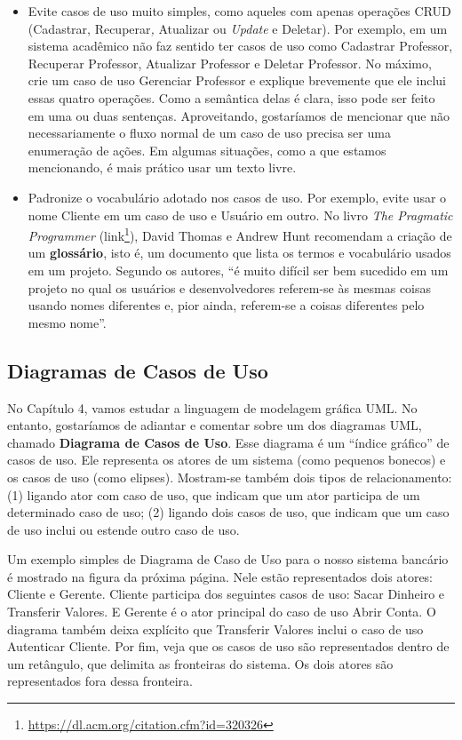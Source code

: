 \documentclass[
  11pt,
  twoside]{book}
\DeclareRobustCommand{\href}[2]{#2\footnote{\url{#1}}}
\begin{document}
\begin{itemize}
\item
  Evite casos de uso muito simples, como aqueles com apenas operações
  CRUD (Cadastrar, Recuperar\emph{,} Atualizar ou \emph{Update} e
  Deletar). Por exemplo, em um sistema acadêmico não faz sentido ter
  casos de uso como Cadastrar Professor, Recuperar Professor, Atualizar
  Professor e Deletar Professor. No máximo, crie um caso de uso
  Gerenciar Professor e explique brevemente que ele inclui essas quatro
  operações. Como a semântica delas é clara, isso pode ser feito em uma
  ou duas sentenças. Aproveitando, gostaríamos de mencionar que não
  necessariamente o fluxo normal de um caso de uso precisa ser uma
  enumeração de ações. Em algumas situações, como a que estamos
  mencionando, é mais prático usar um texto livre.
\item
  Padronize o vocabulário adotado nos casos de uso. Por exemplo, evite
  usar o nome Cliente em um caso de uso e Usuário em outro. No livro
  \emph{The Pragmatic Programmer}
  (\href{https://dl.acm.org/citation.cfm?id=320326}{link}), David Thomas
  e Andrew Hunt recomendam a criação de um \textbf{glossário}, isto é,
  um documento que lista os termos e vocabulário usados em um projeto.
  Segundo os autores, ``é muito difícil ser bem sucedido em um projeto
  no qual os usuários e desenvolvedores referem-se às mesmas coisas
  usando nomes diferentes e, pior ainda, referem-se a coisas diferentes
  pelo mesmo nome''.
\end{itemize}

\hypertarget{diagramas-de-casos-de-uso}{%
\subsection{Diagramas de Casos de Uso}\label{diagramas-de-casos-de-uso}}

 

No Capítulo 4, vamos estudar a linguagem de modelagem gráfica UML. No
entanto, gostaríamos de adiantar e comentar sobre um dos diagramas UML,
chamado \textbf{Diagrama de Casos de Uso}. Esse diagrama é um ``índice
gráfico'' de casos de uso. Ele representa os atores de um sistema (como
pequenos bonecos) e os casos de uso (como elipses). Mostram-se também
dois tipos de relacionamento: (1) ligando ator com caso de uso, que
indicam que um ator participa de um determinado caso de uso; (2) ligando
dois casos de uso, que indicam que um caso de uso inclui ou estende
outro caso de uso.

Um exemplo simples de Diagrama de Caso de Uso para o nosso sistema
bancário é mostrado na figura da próxima página. Nele estão
representados dois atores: Cliente e Gerente. Cliente participa dos
seguintes casos de uso: Sacar Dinheiro e Transferir Valores. E Gerente é
o ator principal do caso de uso Abrir Conta. O diagrama também deixa
explícito que Transferir Valores inclui o caso de uso Autenticar
Cliente. Por fim, veja que os casos de uso são representados dentro de
um retângulo, que delimita as fronteiras do sistema. Os dois atores são
representados fora dessa fronteira.
\end{document}
